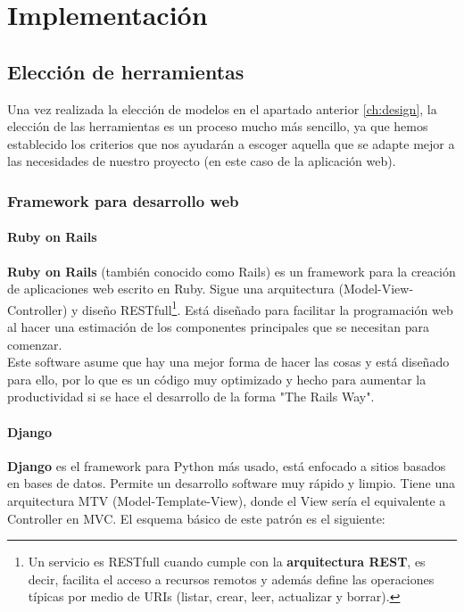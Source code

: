 \chapter{Implementación}

\section{Elección de herramientas} \label{sec:tools}
Una vez realizada la elección de modelos en el apartado anterior \ref{ch:design}, la
elección de las herramientas es un proceso mucho más sencillo, ya que hemos establecido
los criterios que nos ayudarán a escoger aquella que se adapte mejor a las necesidades
de nuestro proyecto (en este caso de la aplicación web).

\subsection{Framework para desarrollo web}

    \subsubsection{Ruby on Rails}
    \textbf{Ruby on Rails} (también conocido como Rails) \cite{ruby-on-rails} es un framework
    para la creación de aplicaciones web escrito en Ruby. Sigue una arquitectura
    (Model-View-Controller) y diseño RESTfull\footnote{Un servicio es RESTfull cuando cumple
    con la \textbf{arquitectura REST}, es decir, facilita el acceso a recursos remotos y
    además define las operaciones típicas por medio de URIs (listar, crear, leer, actualizar
    y borrar).}. Está diseñado para facilitar la programación web al hacer una estimación
    de los componentes principales que se necesitan para comenzar.\\

    Este software asume que hay una mejor forma de hacer las cosas y está diseñado para
    ello, por lo que es un código muy optimizado y hecho para aumentar la productividad
    si se hace el desarrollo de la forma "The Rails Way".

    \subsubsection{Django}
    \textbf{Django} \cite{django} es el framework para Python más usado, está enfocado a sitios
    basados en bases de datos. Permite un desarrollo software muy rápido y limpio. Tiene una
    arquitectura MTV (Model-Template-View), donde el View sería el equivalente a Controller
    en MVC. El esquema básico de este patrón es el siguiente:

